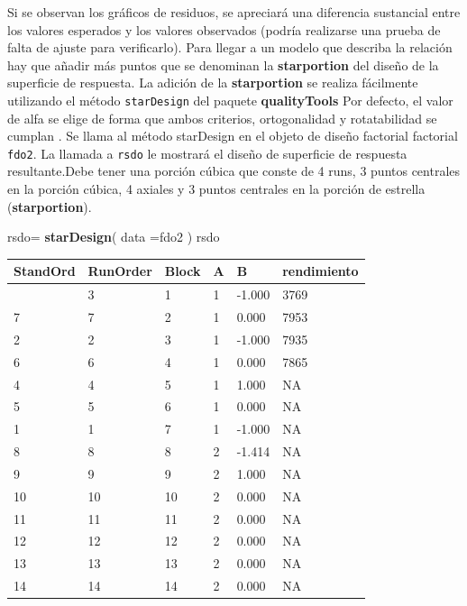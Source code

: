 \documentclass[
]{book}
\newenvironment{Shaded}{\begin{snugshade}}{\end{snugshade}}
\newcommand{\AttributeTok}[1]{\textcolor[rgb]{0.13,0.29,0.53}{#1}}
\newcommand{\FunctionTok}[1]{\textcolor[rgb]{0.13,0.29,0.53}{\textbf{#1}}}
\newcommand{\NormalTok}[1]{#1}
\newcommand{\OtherTok}[1]{\textcolor[rgb]{0.56,0.35,0.01}{#1}}
\begin{document}
Si se observan los gráficos de residuos, se apreciará una diferencia sustancial entre los valores esperados
y los valores observados (podría realizarse una prueba de falta de ajuste para verificarlo).
Para llegar a un modelo que describa la relación hay que añadir más puntos
que se denominan la \textbf{starportion} del diseño de la superficie de respuesta.
La adición de la \textbf{starportion} se realiza fácilmente utilizando el método \texttt{starDesign} del paquete \textbf{qualityTools}
Por defecto, el valor de alfa se elige de forma que ambos criterios, ortogonalidad y
rotatabilidad se cumplan . Se llama al método starDesign en el objeto de diseño factorial
factorial \texttt{fdo2}. La llamada a \texttt{rsdo} le mostrará el diseño de superficie de respuesta resultante.Debe tener una porción cúbica que conste de 4 runs, 3 puntos centrales en la porción cúbica, 4
axiales y 3 puntos centrales en la porción de estrella (\textbf{starportion}).

\begin{Shaded}
\begin{Highlighting}[]
\NormalTok{rsdo}\OtherTok{=} \FunctionTok{starDesign}\NormalTok{( }\AttributeTok{data =}\NormalTok{fdo2 )}
\NormalTok{rsdo}
\end{Highlighting}
\end{Shaded}

\begin{longtable}[]{@{}llllll@{}}
\toprule\noalign{}
StandOrd & RunOrder & Block & A & B & rendimiento \\
\midrule\noalign{}
\endhead
\bottomrule\noalign{}
\endlastfoot
3 & 3 & 1 & 1 & -1.000 & 3769 \\
7 & 7 & 2 & 1 & 0.000 & 7953 \\
2 & 2 & 3 & 1 & -1.000 & 7935 \\
6 & 6 & 4 & 1 & 0.000 & 7865 \\
4 & 4 & 5 & 1 & 1.000 & NA \\
5 & 5 & 6 & 1 & 0.000 & NA \\
1 & 1 & 7 & 1 & -1.000 & NA \\
8 & 8 & 8 & 2 & -1.414 & NA \\
9 & 9 & 9 & 2 & 1.000 & NA \\
10 & 10 & 10 & 2 & 0.000 & NA \\
11 & 11 & 11 & 2 & 0.000 & NA \\
12 & 12 & 12 & 2 & 0.000 & NA \\
13 & 13 & 13 & 2 & 0.000 & NA \\
14 & 14 & 14 & 2 & 0.000 & NA \\
\end{longtable}
\end{document}
